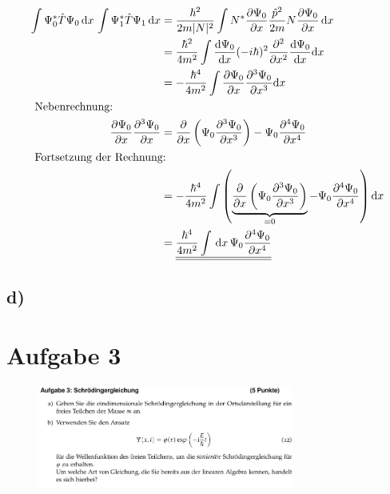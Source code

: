 \begin{align}
    \int \Psi _0^* \hat T \Psi _0 \,\mathrm{d}x\,\int \Psi _1^* \hat T \Psi _1 \, \mathrm{d}x&= \frac{\hbar ^2}{2m\lvert N\rvert^2} \int N^* \frac{\partial \Psi _0}{\partial x} \frac{\hat p ^2}{2m} N \frac{\partial \Psi _0}{\partial x} \,\mathrm{d}x\\
    &= \frac{\hbar ^2}{4m^2} \int \frac{\mathrm{d} \Psi _0}{\mathrm{d} x} (-i \hbar)^2 \frac{\partial ^2}{\partial x^2}\frac{\mathrm{d} \Psi _0}{\mathrm{d} x} \mathrm{d} x \nonumber\\
    &= -\frac{\hbar ^4}{4m^2} \int \frac{\partial \Psi _0}{\partial x} \frac{\partial ^3 \Psi _0}{\partial x^3} \mathrm{d}x\\
    \intertext{
        Nebenrechnung:
    }
    \frac{\partial \Psi _0}{\partial x}\frac{\partial ^3 \Psi _0}{\partial x}&=\frac{\partial}{\partial x}\left(\Psi _0 \frac{\partial ^3 \Psi _0}{\partial x^3} \right)-\Psi _0 \frac{\partial ^4 \Psi _0}{\partial x^4}\\
    \intertext{
        Fortsetzung der Rechnung:
    }
    &=-\frac{\hbar ^4}{4m^2} \int \left(\underbrace{ \frac{\partial}{\partial x}\left(\Psi _0 \frac{\partial ^3 \Psi _0}{\partial x^3}\right)}_{=0} -\Psi _0 \frac{\partial ^4 \Psi _0}{\partial x^4}  \right) \mathrm{d}x \nonumber\\
    &= \underline{\underline{\frac{\hbar ^4}{4m^2} \int\,\mathrm{d}x \,\Psi _0 \frac{\partial ^4\Psi _0}{\partial x^4}  }}
\end{align}


\subsection{d)}




\section{Aufgabe 3}

\begin{figure}[H]
    \centering
    \includegraphics[width=0.75\textwidth]{images/Aufgabe_3ab.jpg}
    \label{fig:3}
\end{figure}

